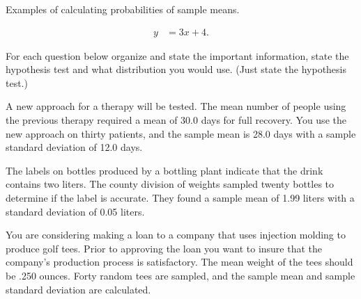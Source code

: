 

\begin{problem}
\item Examples of calculating probabilities of sample means.

  \begin{subproblem}
  \item 
    \begin{eqnarray}
      y & = 3x + 4.
    \end{eqnarray}
    \vfill
  \end{subproblem}


\end{problem}



\begin{problem}

\item For each question below organize and state the important
  information, state the hypothesis test and what distribution you
  would use. (Just state the hypothesis test.)

  \begin{subproblem}
  \item A new approach for a therapy will be tested. The mean number
    of people using the previous therapy required a mean of 30.0 days
    for full recovery. You use the new approach on thirty patients,
    and the sample mean is 28.0 days with a sample standard deviation
    of 12.0 days.

    \vfill

  \item The labels on bottles produced by a bottling plant indicate that
    the drink contains two liters. The county division of weights
    sampled twenty bottles to determine if the label is accurate. They
    found a sample mean of 1.99 liters with a standard deviation of
    0.05 liters.

    \vfill

  \item You are considering making a loan to a company that uses
    injection molding to produce golf tees. Prior to approving the
    loan you want to insure that the company's production process is
    satisfactory. The mean weight of the tees should be .250
    ounces. Forty random tees are sampled, and the sample mean and
    sample standard deviation are calculated. 

    \vfill


\end{subproblem}
\end{problem}
